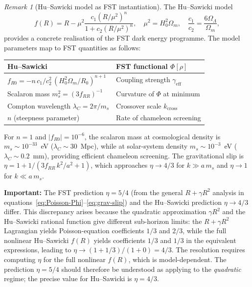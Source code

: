 \documentclass[12pt,a4paper]{article}
\theoremstyle{definition}
\theoremstyle{plain}
\theoremstyle{remark}
\newtheorem{remark}[definition]{Remark}
\begin{document}
\begin{remark}[Hu--Sawicki model as FST instantiation]
\label{rem:hu-sawicki-fst}
The Hu--Sawicki model~\cite{HuSawicki2007}
\[
f(R) = R - \mu^2 \frac{c_1 (R/\mu^2)^n}{1 + c_2 (R/\mu^2)^n}, \quad \mu^2 = H_0^2 \Omega_m, \quad \frac{c_1}{c_2} = \frac{6\Omega_\Lambda}{\Omega_m},
\]
provides a concrete realisation of the FST dark energy programme.  The model parameters map to FST quantities as follows:
\begin{center}
\begin{tabular}{l|l}
\textbf{Hu--Sawicki} & \textbf{FST functional $\Phi[\rho]$} \\
\hline
$f_{R0} = -n\, c_1 / c_2^2\, (H_0^2 \Omega_m / R_0)^{n+1}$ & Coupling strength $\gamma_{\mathrm{eff}}$ \\
Scalaron mass $m_s^2 = (3 f_{RR})^{-1}$ & Curvature of $\Phi$ at minimum \\
Compton wavelength $\lambda_C = 2\pi/m_s$ & Crossover scale $k_{\mathrm{cross}}$ \\
$n$ (steepness parameter) & Rate of chameleon screening \\
\end{tabular}
\end{center}
For $n = 1$ and $|f_{R0}| = 10^{-6}$, the scalaron mass at cosmological density is $m_s \sim 10^{-33}$~eV ($\lambda_C \sim 30$~Mpc), while at solar-system density $m_s \sim 10^{-3}$~eV ($\lambda_C \sim 0.2$~mm), providing efficient chameleon screening.  The gravitational slip is $\eta = 1 + 1/(3 f_{RR}\, k^2/a^2 + 1)$, which approaches $\eta \to 4/3$ for $k \gg a\,m_s$ and $\eta \to 1$ for $k \ll a\,m_s$.

\textbf{Important:} The FST prediction $\eta = 5/4$ (from the general $R + \gamma R^{2}$ analysis in equations~\eqref{eq:Poisson-Phi}--\eqref{eq:grav-slip}) and the Hu--Sawicki prediction $\eta \to 4/3$ differ.  This discrepancy arises because the quadratic approximation $\gamma R^2$ and the Hu--Sawicki rational function give different sub-horizon limits: the $R + \gamma R^2$ Lagrangian yields Poisson-equation coefficients $1/3$ and $2/3$, while the full nonlinear Hu--Sawicki $f(R)$ yields coefficients $1/3$ and $1/3$ in the equivalent expressions, leading to $\eta \to (1 + 1/3)/(1 + 0) = 4/3$.  The resolution requires computing $\eta$ for the full nonlinear $f(R)$, which is model-dependent.  The prediction $\eta = 5/4$ should therefore be understood as applying to the \emph{quadratic} regime; the precise value for Hu--Sawicki is $\eta = 4/3$.
\end{remark}
\end{document}
